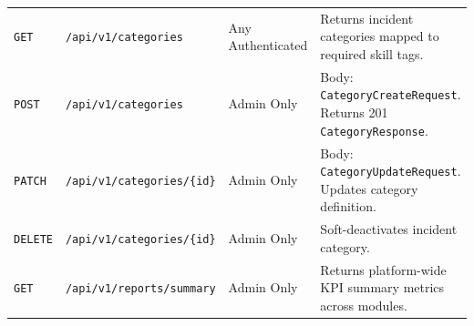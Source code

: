 \documentclass[11pt,a4paper,oneside]{report}
\begin{document}
\begin{table}[H]
\begin{tabular}{p{1.2cm}p{5.5cm}p{2.5cm}p{5.0cm}}
\texttt{GET} & \texttt{/api/v1/categories} & Any Authenticated & Returns incident categories mapped to required skill tags. \\
\texttt{POST} & \texttt{/api/v1/categories} & Admin Only & Body: \texttt{CategoryCreateRequest}. Returns 201 \texttt{CategoryResponse}. \\
\texttt{PATCH} & \texttt{/api/v1/categories/\{id\}} & Admin Only & Body: \texttt{CategoryUpdateRequest}. Updates category definition. \\
\texttt{DELETE} & \texttt{/api/v1/categories/\{id\}} & Admin Only & Soft-deactivates incident category. \\
\texttt{GET} & \texttt{/api/v1/reports/summary} & Admin Only & Returns platform-wide KPI summary metrics across modules. \\
\bottomrule
\end{tabular}
\end{table}
\end{document}
